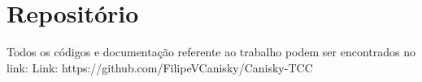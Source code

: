 \chapter{{\normalfont Repositório}}
\label{apendice: a}

Todos os códigos e documentação referente ao trabalho podem ser encontrados no link:
Link: https://github.com/FilipeVCanisky/Canisky-TCC